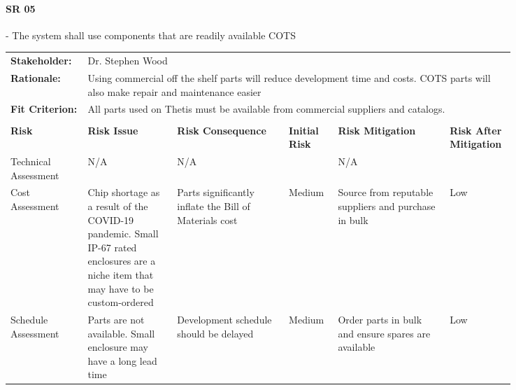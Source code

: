 \begin{landscape}


\paragraph*{SR 05} - The system shall use components that are readily available COTS

{\fontsize{8pt}{8pt}\selectfont
\begin{longtable}{| p{0.12\linewidth} | p{0.16\linewidth} |  p{0.20\linewidth} | p{0.08\linewidth} | p{0.20\linewidth} | p{0.08\linewidth} |}
	\hline \endlastfoot
	
	\hline
	\rowcolor[gray]{0.8}
	\multicolumn{6}{|c|}{ } \\
	\hline
	\textbf{Stakeholder:} & \multicolumn{5}{|l|}{Dr. Stephen Wood} \\
	\hline
	\textbf{Rationale:} & \multicolumn{5}{|p{0.8\linewidth}|}{Using commercial off the shelf parts will reduce development time and costs. COTS parts will also make repair and maintenance easier} \\
	\hline
	\textbf{Fit Criterion:} & \multicolumn{5}{|p{0.8\linewidth}|}{All parts used on Thetis must be available from commercial suppliers and catalogs.} \\
	\hline
	\rowcolor[gray]{0.8}
	\multicolumn{6}{|c|}{ } \\
	\hline
	\textbf{Risk} & \textbf{Risk Issue} & \textbf{Risk Consequence} & \textbf{Initial Risk} & \textbf{Risk Mitigation} & \textbf{Risk \newline After \newline Mitigation} \\
	\hline
	Technical \newline Assessment & N/A & N/A & \cellcolor[gray]{0.8} & N/A & \cellcolor[gray]{0.8} \\
	\hline
	Cost \newline Assessment & Chip shortage as a result of the COVID-19 pandemic. \newline Small IP-67 rated enclosures are a niche item that may have to be custom-ordered & Parts significantly inflate the Bill of Materials cost & \cellcolor{yellow} Medium & Source from reputable suppliers and purchase in bulk & \cellcolor{green} Low \\
	\hline
	Schedule \newline Assessment & Parts are not available. \newline Small enclosure may have a long lead time & Development schedule should be delayed & \cellcolor{yellow} Medium & Order parts in bulk and ensure spares are available & \cellcolor{green} Low \\

\end{longtable}}
\end{landscape}
